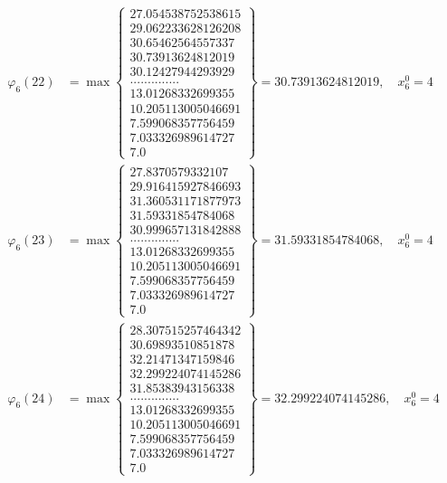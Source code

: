 \documentclass{article}
\begin{document}
\begin{align*}
  
  
  
\varphi_{6}(22) &= \max \left\{ \begin{array}{c}
27.054538752538615 \\
 29.062233628126208 \\
 30.65462564557337 \\
 30.73913624812019 \\
 30.12427944293929 \\
 .............. \\
 13.01268332699355 \\
 10.205113005046691 \\
 7.599068357756459 \\
 7.033326989614727 \\
 7.0
\end{array} \right\} = 30.73913624812019, \quad x_{6}^0 = 4\\
  
  
  
  
\varphi_{6}(23) &= \max \left\{ \begin{array}{c}
27.8370579332107 \\
 29.916415927846693 \\
 31.360531171877973 \\
 31.59331854784068 \\
 30.999657131842888 \\
 .............. \\
 13.01268332699355 \\
 10.205113005046691 \\
 7.599068357756459 \\
 7.033326989614727 \\
 7.0
\end{array} \right\} = 31.59331854784068, \quad x_{6}^0 = 4\\
  
  
  
  
\varphi_{6}(24) &= \max \left\{ \begin{array}{c}
28.307515257464342 \\
 30.69893510851878 \\
 32.21471347159846 \\
 32.299224074145286 \\
 31.85383943156338 \\
 .............. \\
 13.01268332699355 \\
 10.205113005046691 \\
 7.599068357756459 \\
 7.033326989614727 \\
 7.0
\end{array} \right\} = 32.299224074145286, \quad x_{6}^0 = 4\\
  

\end{align*}
\end{document}
